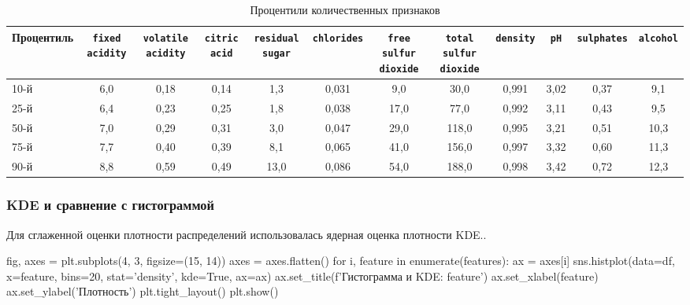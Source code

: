 \begin{table}[H]
	\centering
	\caption{Процентили количественных признаков}
	\label{tab:percentiles}
	\scriptsize
	
	\begin{tabularx}{\textwidth}{LCCCCCCCCCCC}
		\hline
		Процентиль &
		\texttt{fixed acidity} &
		\texttt{volatile acidity} &
		\texttt{citric acid} &
		\texttt{residual sugar} &
		\texttt{chlorides} &
		\texttt{free sulfur dioxide} &
		\texttt{total sulfur dioxide} &
		\texttt{density} &
		\texttt{pH} &
		\texttt{sulphates} &
		\texttt{alcohol} \\
		\hline
		
		10-й &
		6{,}0 & 0{,}18 & 0{,}14 & 1{,}3 & 0{,}031 & 9{,}0 & 30{,}0 & 0{,}991 & 3{,}02 & 0{,}37 & 9{,}1 \\
		
		25-й &
		6{,}4 & 0{,}23 & 0{,}25 & 1{,}8 & 0{,}038 & 17{,}0 & 77{,}0 & 0{,}992 & 3{,}11 & 0{,}43 & 9{,}5 \\
		
		50-й &
		7{,}0 & 0{,}29 & 0{,}31 & 3{,}0 & 0{,}047 & 29{,}0 & 118{,}0 & 0{,}995 & 3{,}21 & 0{,}51 & 10{,}3 \\
		
		75-й &
		7{,}7 & 0{,}40 & 0{,}39 & 8{,}1 & 0{,}065 & 41{,}0 & 156{,}0 & 0{,}997 & 3{,}32 & 0{,}60 & 11{,}3 \\
		
		90-й &
		8{,}8 & 0{,}59 & 0{,}49 & 13{,}0 & 0{,}086 & 54{,}0 & 188{,}0 & 0{,}998 & 3{,}42 & 0{,}72 & 12{,}3 \\
		
		\hline
	\end{tabularx}
\end{table}


\subsubsection*{KDE и сравнение с гистограммой}
 
Для сглаженной оценки плотности распределений использовалась ядерная оценка плотности KDE..
 
\begin{Code}
fig, axes = plt.subplots(4, 3, figsize=(15, 14))
axes = axes.flatten()
for i, feature in enumerate(features):
	ax = axes[i]
	sns.histplot(data=df, x=feature, bins=20, stat='density', kde=True, ax=ax)
	ax.set_title(f'Гистограмма и KDE: {feature}')
	ax.set_xlabel(feature)
	ax.set_ylabel('Плотность')
plt.tight_layout()
plt.show()
\end{Code}
 

